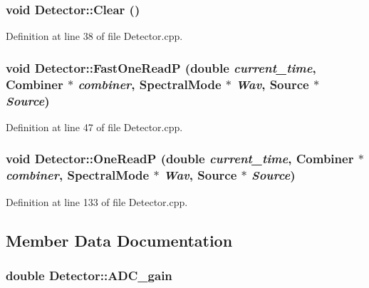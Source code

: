 \hypertarget{classDetector_a57e174c4021b6a66f285ba63dfba1070}{
\subsubsection[{Clear}]{\setlength{\rightskip}{0pt plus 5cm}void Detector::Clear ()}}
\label{classDetector_a57e174c4021b6a66f285ba63dfba1070}


Definition at line 38 of file Detector.cpp.

\hypertarget{classDetector_adfc83c9c00ad09756eb5a26c167cbb62}{
\subsubsection[{FastOneReadP}]{\setlength{\rightskip}{0pt plus 5cm}void Detector::FastOneReadP (double {\em current\_\-time}, \/  {\bf Combiner} $\ast$ {\em combiner}, \/  {\bf SpectralMode} $\ast$ {\em Wav}, \/  {\bf Source} $\ast$ {\em Source})}}
\label{classDetector_adfc83c9c00ad09756eb5a26c167cbb62}


Definition at line 47 of file Detector.cpp.

\hypertarget{classDetector_a65dc093ac969e95438a8b8e29cf316f0}{
\subsubsection[{OneReadP}]{\setlength{\rightskip}{0pt plus 5cm}void Detector::OneReadP (double {\em current\_\-time}, \/  {\bf Combiner} $\ast$ {\em combiner}, \/  {\bf SpectralMode} $\ast$ {\em Wav}, \/  {\bf Source} $\ast$ {\em Source})}}
\label{classDetector_a65dc093ac969e95438a8b8e29cf316f0}


Definition at line 133 of file Detector.cpp.



\subsection{Member Data Documentation}
\hypertarget{classDetector_adb18913ba2480228ee13611040ad7bfe}{
\subsubsection[{ADC\_\-gain}]{\setlength{\rightskip}{0pt plus 5cm}double {\bf Detector::ADC\_\-gain}}}
\label{classDetector_adb18913ba2480228ee13611040ad7bfe}


